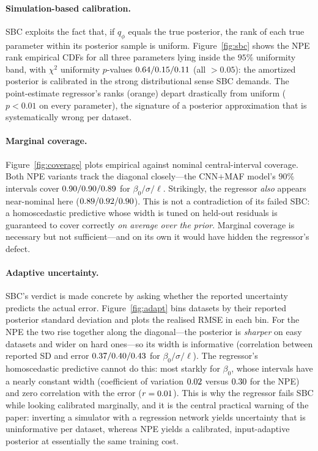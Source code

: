 \documentclass[11pt]{article}
\begin{document}
\paragraph{Simulation-based calibration.}
SBC \citep{talts2018validating} exploits the fact that, if $q_\phi$ equals the
true posterior, the rank of each true parameter within its posterior sample is
uniform. Figure~\ref{fig:sbc} shows the NPE rank empirical CDFs for all three
parameters lying inside the $95\%$ uniformity band, with $\chi^2$ uniformity
$p$-values $0.64/0.15/0.11$ (all $>0.05$): the amortized posterior is
calibrated in the strong distributional sense SBC demands. The point-estimate
regressor's ranks (orange) depart drastically from uniform ($p<0.01$ on every
parameter), the signature of a posterior approximation that is systematically
wrong per dataset.

\paragraph{Marginal coverage.}
Figure~\ref{fig:coverage} plots empirical against nominal central-interval
coverage. Both NPE variants track the diagonal closely---the CNN$+$MAF model's
$90\%$ intervals cover $0.90/0.90/0.89$ for $\beta_0/\sigma/\ell$.
Strikingly, the regressor \emph{also} appears near-nominal here
($0.89/0.92/0.90$). This is not a contradiction of its failed SBC: a
homoscedastic predictive whose width is tuned on held-out residuals is guaranteed
to cover correctly \emph{on average over the prior}. Marginal coverage is
necessary but not sufficient---and on its own it would have hidden the regressor's
defect.

\paragraph{Adaptive uncertainty.}
SBC's verdict is made concrete by asking whether the reported uncertainty
predicts the actual error. Figure~\ref{fig:adapt} bins datasets by their reported
posterior standard deviation and plots the realised RMSE in each bin. For the NPE
the two rise together along the diagonal---the posterior is \emph{sharper} on
easy datasets and wider on hard ones---so its width is informative (correlation
between reported SD and error $0.37/0.40/0.43$ for
$\beta_0/\sigma/\ell$). The regressor's homoscedastic predictive cannot do this:
most starkly for $\beta_0$, whose intervals have a nearly constant width
(coefficient of variation $0.02$ versus $0.30$ for the NPE) and zero
correlation with the error ($r=0.01$). This is why the regressor fails SBC
while looking calibrated marginally, and it is the central practical warning of
the paper: inverting a simulator with a regression network yields uncertainty
that is uninformative per dataset, whereas NPE yields a calibrated, input-adaptive
posterior at essentially the same training cost.
\end{document}
